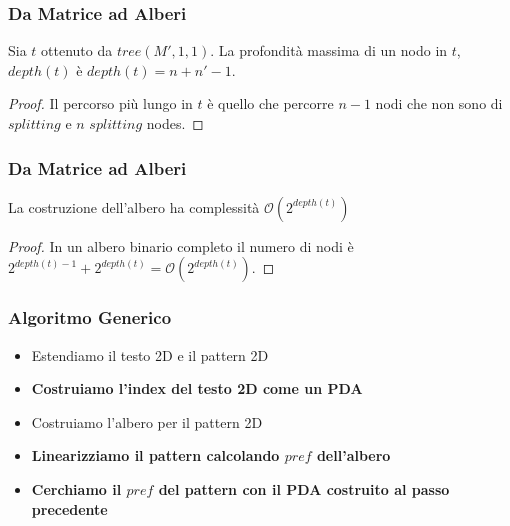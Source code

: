 \documentclass{beamer}
\newcommand{\bigO}{\ensuremath{\mathcal{O}}} %
\begin{document}
\begin{frame}
\frametitle{Da Matrice ad Alberi}
\begin{theorem}[]
Sia $t$ ottenuto da $tree(M',1,1)$. La profondità massima di un nodo in $t$, $depth(t)$ è $depth(t) = n + n' -1$. 
\end{theorem}


\begin{proof}
Il percorso più lungo in $t$ è quello che percorre $n -1$ nodi che non sono di $splitting$ e $n$ $splitting$ nodes.
\end{proof}

\frametitle{Da Matrice ad Alberi}
\begin{theorem}[]
La costruzione dell'albero ha complessità $\bigO{(2^{depth(t)})}$
\end{theorem}


\begin{proof}
In un albero binario completo il numero di nodi è $2^{depth(t)-1} + 2^{depth(t)} = \bigO{(2^{depth(t)})}$. 
\end{proof}
\end{frame}

\begin{frame}
\frametitle{Algoritmo Generico}
\begin{itemize}
\item Estendiamo il testo 2D e il pattern 2D 
\item \textbf{Costruiamo l'index del testo 2D come un PDA}
\item Costruiamo l'albero per il pattern 2D
\item \textbf{Linearizziamo il pattern calcolando $pref$ dell'albero}
\item \textbf{Cerchiamo il $pref$ del pattern con il PDA costruito al passo precedente}
\end{itemize}
\end{frame}
\end{document}
